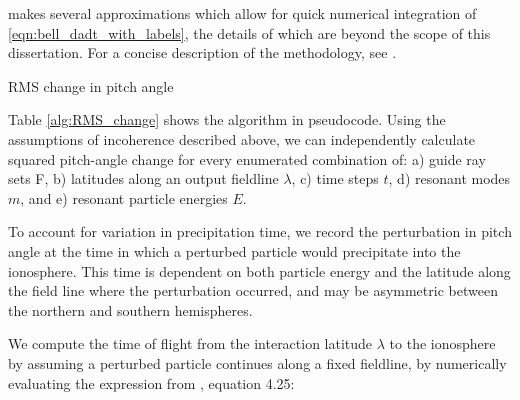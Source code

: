 \citeauthor{Bortnik2005} makes several approximations which allow for quick numerical integration of \eqref{eqn:bell_dadt_with_labels}, the details of which are beyond the scope of this dissertation. For a concise description of the methodology, see \cite{Bortnik2006}.

\begin{algorithm}[t]
\caption{RMS change in pitch angle}\label{alg:RMS_change}
\begin{algorithmic}[1]
						 
						 
					\EndFor
				\EndFor
			\EndFor
		\EndFor
	\EndFor
\EndFor
\end{algorithmic}
\end{algorithm}


Table \ref{alg:RMS_change} shows the algorithm in pseudocode. Using the assumptions of incoherence described above, we can independently calculate squared pitch-angle change for every enumerated combination of: a) guide ray sets F, b) latitudes along an output fieldline $\lambda$, c) time steps $t$, d) resonant modes $m$, and e) resonant particle energies $E$. 

To account for variation in precipitation time, we record the perturbation in pitch angle at the time in which a perturbed particle would precipitate into the ionosphere. This time is dependent on both particle energy and the latitude along the field line where the perturbation occurred, and may be asymmetric between the northern and southern hemispheres.

We compute the time of flight from the interaction latitude $\lambda$ to the ionosphere by assuming a perturbed particle continues along a fixed fieldline, by numerically evaluating the expression from \cite{Walt1994}, equation 4.25:

